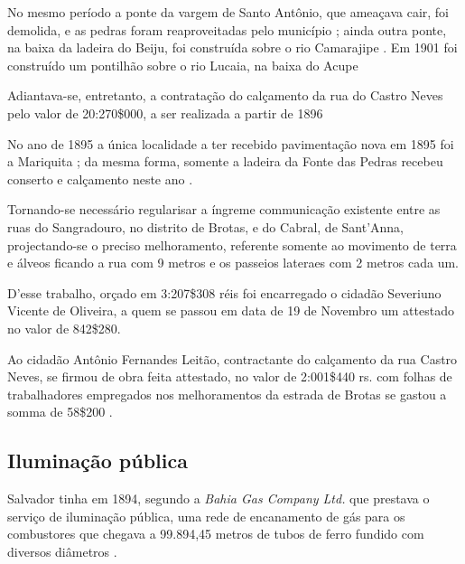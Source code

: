 No mesmo período a ponte da vargem de Santo Antônio, que ameaçava cair, foi demolida, e as pedras foram reaproveitadas pelo município \cite[p.~137]{salvador_relatorio_1896}; ainda outra ponte, na baixa da ladeira do Beiju, foi construída sobre o rio Camarajipe \cite[p.~156]{salvador_relatorio_1894}. Em 1901 foi construído um pontilhão sobre o rio Lucaia, na baixa do Acupe 

Adiantava-se, entretanto, a contratação do calçamento da rua do Castro Neves pelo valor de 20:270\$000, a ser realizada a partir de 1896 \cite[p.~23]{salvador_relatorio_1896}

No ano de 1895 a única localidade a ter recebido pavimentação nova em 1895 foi a Mariquita \cite[p.~16]{salvador_relatorio_1896}; da mesma forma, somente a ladeira da Fonte das Pedras recebeu conserto e calçamento neste ano \cite[p.~16]{salvador_relatorio_1896}. 



\begin{citacao}
Tornando-se necessário regularisar a íngreme communicação existente entre as ruas do Sangradouro, no distrito de Brotas, e do Cabral, de Sant'Anna, projectando-se o preciso melhoramento, referente somente ao movimento de terra e álveos ficando a rua com 9 metros e os passeios lateraes com 2 metros cada um.

D'esse trabalho, orçado em 3:207\$308 réis foi encarregado o cidadão Severiuno Vicente de Oliveira, a quem se passou em data de 19 de Novembro um attestado no valor de 842\$280.
\end{citacao}



\begin{citacao}
Ao cidadão Antônio Fernandes Leitão, contractante do calçamento da rua Castro Neves, se firmou de obra feita attestado, no valor de 2:001\$440 rs. com folhas de trabalhadores empregados nos melhoramentos da estrada de Brotas se gastou a somma de 58\$200 \cite[p.~]{salvador_relatorio_1896}.
\end{citacao}






\subsection{Iluminação pública}


Salvador tinha em 1894, segundo a \textit{Bahia Gas Company Ltd.} que prestava o serviço de iluminação pública, uma rede de encanamento de gás para os combustores que chegava a 99.894,45 metros de tubos de ferro fundido com diversos diâmetros \cite[p.~178]{salvador_relatorio_1894}.

